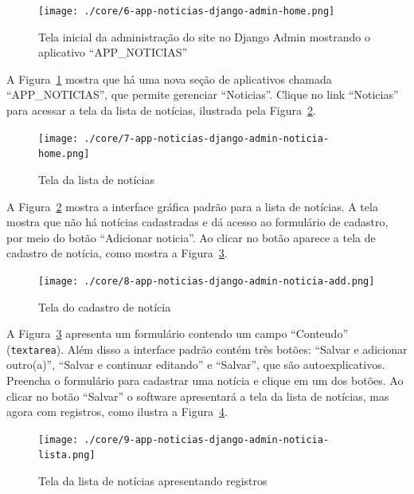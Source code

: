 \documentclass[brazil,a4paper,oneside,openright,parskip=full]{book}
\newcommand{\passthrough}[1]{#1}
\begin{document}
\begin{figure}
\hypertarget{fig:6-app-noticias-django-admin-home}{%
\centering
\texttt{[image: ./core/6-app-noticias-django-admin-home.png]}
\caption{Tela inicial da administração do site no Django Admin mostrando
o aplicativo
``APP\_NOTICIAS''}\label{fig:6-app-noticias-django-admin-home}
}
\end{figure}

A Figura~\ref{fig:6-app-noticias-django-admin-home} mostra que há uma
nova seção de aplicativos chamada ``APP\_NOTICIAS'', que permite
gerenciar ``Noticias''. Clique no link ``Noticias'' para acessar a tela
da lista de notícias, ilustrada pela
Figura~\ref{fig:7-app-noticias-django-admin-noticia-home}.

\begin{figure}
\hypertarget{fig:7-app-noticias-django-admin-noticia-home}{%
\centering
\texttt{[image: ./core/7-app-noticias-django-admin-noticia-home.png]}
\caption{Tela da lista de
notícias}\label{fig:7-app-noticias-django-admin-noticia-home}
}
\end{figure}

A Figura~\ref{fig:7-app-noticias-django-admin-noticia-home} mostra a
interface gráfica padrão para a lista de notícias. A tela mostra que não
há notícias cadastradas e dá acesso ao formulário de cadastro, por meio
do botão ``Adicionar noticia''. Ao clicar no botão aparece a tela de
cadastro de notícia, como mostra a
Figura~\ref{fig:8-app-noticias-django-admin-noticia-add}.

\begin{figure}
\hypertarget{fig:8-app-noticias-django-admin-noticia-add}{%
\centering
\texttt{[image: ./core/8-app-noticias-django-admin-noticia-add.png]}
\caption{Tela do cadastro de
notícia}\label{fig:8-app-noticias-django-admin-noticia-add}
}
\end{figure}

A Figura~\ref{fig:8-app-noticias-django-admin-noticia-add} apresenta um
formulário contendo um campo ``Conteudo''
(\passthrough{\lstinline!textarea!}). Além disso a interface padrão
contém três botões: ``Salvar e adicionar outro(a)'', ``Salvar e
continuar editando'' e ``Salvar'', que são autoexplicativos. Preencha o
formulário para cadastrar uma notícia e clique em um dos botões. Ao
clicar no botão ``Salvar'' o software apresentará a tela da lista de
notícias, mas agora com registros, como ilustra a
Figura~\ref{fig:9-app-noticias-django-admin-noticia-lista}.

\begin{figure}
\hypertarget{fig:9-app-noticias-django-admin-noticia-lista}{%
\centering
\texttt{[image: ./core/9-app-noticias-django-admin-noticia-lista.png]}
\caption{Tela da lista de notícias apresentando
registros}\label{fig:9-app-noticias-django-admin-noticia-lista}
}
\end{figure}
\end{document}

